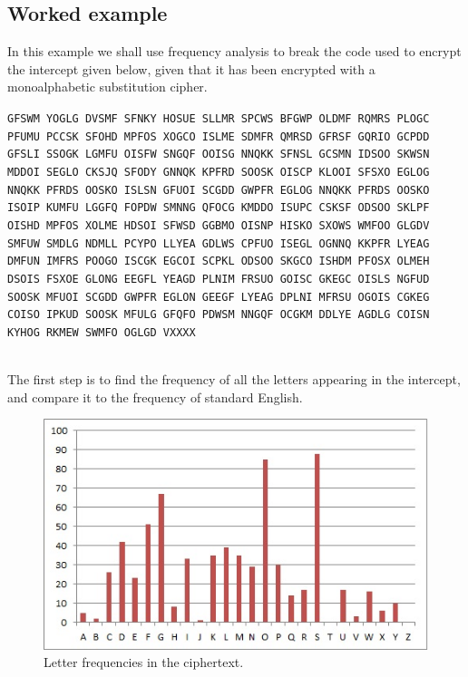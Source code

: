 \documentclass[Lau,binding=0.6cm,oneside]{sapthesis}
\begin{document}
\subsection{Worked example}
In this example we shall use frequency analysis to break the code used to encrypt the intercept given below, given that it has been encrypted with a monoalphabetic substitution cipher.\\

\begin{displayquote}\texttt{\small{GFSWM YOGLG DVSMF SFNKY HOSUE SLLMR SPCWS BFGWP OLDMF RQMRS PLOGC PFUMU PCCSK SFOHD MPFOS XOGCO ISLME SDMFR QMRSD GFRSF GQRIO GCPDD GFSLI SSOGK LGMFU OISFW SNGQF OOISG NNQKK SFNSL GCSMN IDSOO SKWSN MDDOI SEGLO CKSJQ SFODY GNNQK KPFRD SOOSK OISCP KLOOI SFSXO EGLOG NNQKK PFRDS OOSKO ISLSN GFUOI SCGDD GWPFR EGLOG NNQKK PFRDS OOSKO ISOIP KUMFU LGGFQ FOPDW SMNNG QFOCG KMDDO ISUPC CSKSF ODSOO SKLPF OISHD MPFOS XOLME HDSOI SFWSD GGBMO OISNP HISKO SXOWS WMFOO GLGDV SMFUW SMDLG NDMLL PCYPO LLYEA GDLWS CPFUO ISEGL OGNNQ KKPFR LYEAG DMFUN IMFRS POOGO ISCGK EGCOI SCPKL ODSOO SKGCO ISHDM PFOSX OLMEH DSOIS FSXOE GLONG EEGFL YEAGD PLNIM FRSUO GOISC GKEGC OISLS NGFUD SOOSK MFUOI SCGDD GWPFR EGLON GEEGF LYEAG DPLNI MFRSU OGOIS CGKEG COISO IPKUD SOOSK MFULG GFQFO PDWSM NNGQF OCGKM DDLYE AGDLG COISN KYHOG RKMEW SWMFO OGLGD VXXXX
}}
\end{displayquote}
\ \\
The first step is to find the frequency of all the letters appearing in the intercept, and compare it to the frequency of standard English.\\
\begin{figure}[H]
\includegraphics[scale=0.7]{frequency_analysis_example}
\centering
\caption{Letter frequencies in the ciphertext.}
\centering
\end{figure}
\end{document}
